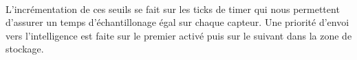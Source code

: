 
\paragraph{}
L'incrémentation de ces seuils se fait sur les ticks de timer qui nous
permettent d'assurer un temps d'échantillonage égal sur chaque capteur.
Une priorité d'envoi vers l'intelligence est faite sur le premier activé puis
sur le suivant dans la zone de stockage. 
